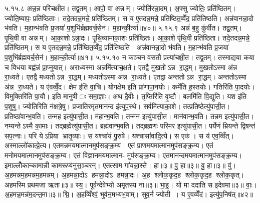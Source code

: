 ५.१५.८
अन्न॒न्न परि॑चक्षीत। तद्व्र॒तम्। आपो॒ वा अन्नम्। ज्योति॑रन्ना॒दम्। अ॒फ्सु ज्योतिः॒ प्रति॑ष्ठितम्। ज्योति॒ष्यापः॒ प्रति॑ष्ठिताः। तदे॒तदन्न॒मन्ने॒ प्रति॑ष्ठितम्। स य ए॒तदन्न॒मन्ने॒ प्रति॑ष्ठित॒व्वेँद॒ प्रति॑तिष्ठति। अन्न॑वानन्ना॒दो भ॑वति। म॒हान्भ॑वति प्र॒जया॑ प॒शुभि॑र्ब्रह्मवर्च॒सेन॑। म॒हान्की॒र्त्या॥४०॥
५.१५.९
अन्नं॑ ब॒हु कु॑र्वीत। तद्व्र॒तम्। पृ॒थि॒वी वा अन्नम्। आ॒का॒शोऽन्ना॒दः। पृ॒थि॒व्यामा॑का॒शः प्रति॑ष्ठितः। आ॒का॒शे पृ॑थि॒वी प्रति॑ष्ठिता। तदे॒तदन्न॒मन्ने॒ प्रति॑ष्ठितम्। स य ए॒तदन्न॒मन्ने॒ प्रति॑ष्ठित॒व्वेँद॒ प्रति॑तिष्ठति। अन्न॑वानन्ना॒दो भ॑वति। म॒हान्भ॑वति प्र॒जया॑ प॒शुभि॑र्ब्रह्मवर्च॒सेन॑। म॒हान्की॒र्त्या॥४१॥
५.१५.१०
न कञ्चन वसतौ प्रत्या॑चक्षी॒त। तद्व्र॒तम्। तस्माद्यया कया च विधया बह्व॑न्नं प्रा॒प्नुयात्। अराध्यस्मा अन्नमि॑त्याच॒क्षते। एतद्वै मुखतोऽन्न रा॒द्धम्। मुखतोऽस्मा अ॑न्न रा॒ध्यते। एतद्वै मध्यतोऽन्न रा॒द्धम्। मध्यतोऽस्मा अ॑न्न रा॒ध्यते। एतद्वा अन्ततोऽन्न रा॒द्धम्। अन्ततोऽस्मा अ॑न्न रा॒ध्यते। य ए॑वव्वेँ॒द। क्षेम इ॑ति वा॒चि। योगक्षेम इति प्रा॑णापा॒नयोः। कर्मे॑ति ह॒स्तयोः। गतिरि॑ति पा॒दयोः। विमुक्तिरि॑ति पा॒यौ। इति मानुषीः समा॒ज्ञाः। अथ दै॒वीः। तृप्तिरि॑ति वृ॒ष्टौ। बलमि॑ति वि॒द्युति। यश इ॑ति प॒शुषु। ज्योतिरिति न॑क्षत्रे॒षु। प्रजातिरमृतमानन्द इ॑त्युप॒स्थे। सर्वमि॑त्याका॒शे। तत्प्रतिष्ठेत्यु॑पासी॒त। प्रतिष्ठा॑वान्भ॒वति। तन्मह इत्यु॑पासी॒त। म॑हान्भ॒वति। तन्मन इत्यु॑पासी॒त। मान॑वान्भ॒वति। तन्नम इत्यु॑पासी॒त। नम्यन्तेऽस्मै का॒माः। तद्ब्रह्मेत्यु॑पासी॒त। ब्रह्म॑वान्भ॒वति। तद्ब्रह्मणः परिमर इत्यु॑पासी॒त। पर्येणं म्रियन्ते द्विषन्त॑ सप॒त्नाः। परि येऽप्रिया भ्रातृ॒व्याः। स यश्चा॑यं पु॒रुषे। यश्चासा॑वादि॒त्ये। स एक॑। स य॑ एव॒व्विँत्। अस्माल्लो॑कात्प्रे॒त्य। एतमन्नमयमात्मानमुप॑सङ्क्र॒म्य। एतं प्राणमयमात्मानमुप॑सङ्क्र॒म्य। एतं मनोमयमात्मानमुप॑सङ्क्र॒म्य। एतं विज्ञानमयमात्मान- मुप॑सङ्क्र॒म्य। एतमानन्दमयमात्मानमुप॑सङ्क्र॒म्य। इमाल्लोँकान्कामान्नी कामरूप्य॑नुस॒ञ्चरन्। एतत्साम गा॑यन्ना॒स्ते। हा॥३॥ वु॒ हा॥३॥ वु॒ हा॥३॥ वु॑। अ॒हमन्नम॒हमन्नम॒हमन्नम्। अ॒हमन्ना॒दोऽ हमन्ना॒दोऽ हमन्ना॒दः। अ॒ह श्लोक॒कृद॒ह श्लोक॒कृद॒ह श्लोक॒कृत्। अहमस्मि प्रथमजा ऋता॥३॥ स्य॒। पूर्वन्देवेभ्यो अमृतस्य ना॥३॥ भा॒इ॒। यो मा ददाति स इदेवमा॥३॥ वाः॒। अ॒हमन्न॒मन्न॑म॒दन्त॒मा॥३॥ द्मि॒। अ॒हव्विँश्वं॒ भुव॑न॒मभ्य॑भ॒वाम्। सुव॒र्न ज्योती। य ए॒वव्वेँद॑। इत्यु॑प॒निष॑त्॥४२॥

